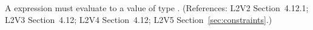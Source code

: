 A \Constraint {} expression must evaluate to a value of type
.  (References: L2V2 Section~4.12.1; L2V3
Section~4.12; L2V4 Section~4.12; L2V5 Section~\ref{sec:constraints}.)
